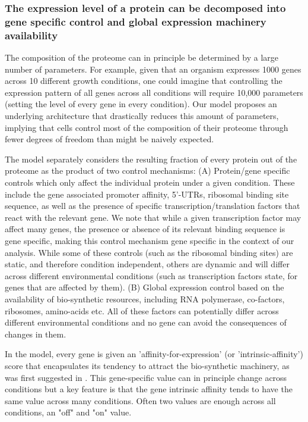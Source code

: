 \documentclass{article}
\begin{document}
\subsubsection{The expression level of a protein can be decomposed into gene specific control and global
expression machinery availability}
The composition of the proteome can in principle be determined by a large number of parameters.
For example, given that an organism expresses 1000 genes across 10 different growth conditions, one could imagine that controlling the expression pattern of all genes across all conditions will require 10,000 parameters (setting the level of every gene in every condition).
Our model proposes an underlying architecture that drastically reduces this amount of parameters, implying that cells control most of the composition of their proteome through fewer degrees of freedom than might be naively expected.

The model separately considers the resulting fraction of every protein out of the proteome as the product of two control mechanisms:
(A) Protein/gene specific controls which only affect the individual protein under a given condition.
These include the gene associated promoter affinity, 5'-UTRs, ribosomal binding site sequence, as well as the presence of specific transcription/translation factors that react with the relevant gene.
We note that while a given transcription factor may affect many genes, the presence or absence of its relevant binding sequence is gene specific, making this control mechanism gene specific in the context of our analysis.
  While some of these controls (such as the ribosomal binding sites) are static, and therefore condition independent, others are dynamic and will differ across different environmental conditions (such as transcription factors state, for genes that are affected by them).
(B) Global expression control based on the availability of bio-synthetic resources, including RNA polymerase, co-factors, ribosomes, amino-acids etc.
  All of these factors can potentially differ across different environmental conditions and no gene can avoid the consequences of changes in them.

In the model, every gene is given an 'affinity-for-expression' (or 'intrinsic-affinity') score that encapsulates its tendency to attract the bio-synthetic machinery, as was first suggested in \cite{Maaloe1969}.
This gene-specific value can in principle change across conditions but a key feature is that the gene intrinsic affinity tends to have the same value across many conditions.
Often two values are enough across all conditions, an "off" and "on" value.
\end{document}
